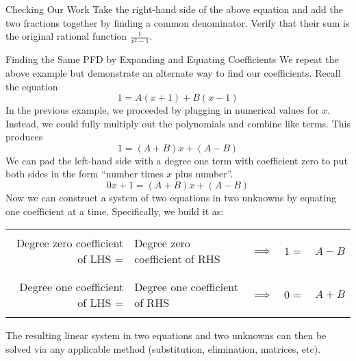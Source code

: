 \begin{exercise}{Checking Our Work \Coffeecup} Take the right-hand side of the above equation and add the two fractions together by finding a common denominator. Verify that their sum is the original rational function $\frac{1}{x^2-1}$.
\end{exercise}
\begin{example}{Finding the Same PFD by Expanding and Equating Coefficients}\label{57Varieties}
We repeat the above example but demonstrate an alternate way to find our coefficients.  Recall the equation $$1=A(x+1)+B(x-1) $$  In the previous example, we proceeded by plugging in numerical values for $x$.  Instead, we could fully multiply out the polynomials and combine like terms.  This produces $$1=(A+B)x+(A-B) $$  We can pad the left-hand side with a degree one term with coefficient zero to put both sides in the form ``number times $x$ plus number''.  $$0x+1=(A+B)x+(A-B) $$  Now we can construct a system of two equations in two unknowns by equating one coefficient at a time.  Specifically, we build it as:
\begin{center}
\begin{tabular}{|r l|c|l r|} \hline & & & & \\ 
Degree zero coefficient of LHS = &\hspace{-.18in} Degree zero coefficient of RHS & $\implies $ & $1 =$ & \hspace{-.18in} $A-B$ \\ & & & &  \\ \hline & & & &  \\ 
Degree one coefficient of LHS = & \hspace{-.18in} Degree one coefficient of RHS & $\implies $ & $0 =$ & \hspace{-.18in} $A+B$ \\ & & & &  \\ \hline 
\end{tabular}
\end{center}
The resulting linear system in two equations and two unknowns can then be solved via any applicable method (substitution, elimination, matrices, etc). 
\end{example}
